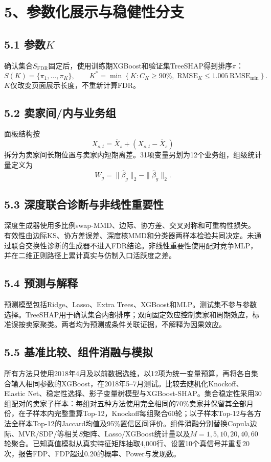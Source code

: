 \documentclass[UTF8,12pt,a4paper]{ctexart}
\begin{document}
\section*{5、参数化展示与稳健性分支}

\subsection*{5.1 参数$K$}

确认集合$S_{\mathrm{FDR}}$固定后，使用训练期XGBoost和验证集TreeSHAP得到排序$\pi$：
\[
S(K)=\{\pi_1,\ldots,\pi_K\},\qquad
K^*=\min\left\{K:C_K\ge90\%,\;
\mathrm{RMSE}_{K}\le1.005\,\mathrm{RMSE}_{\min}\right\}.
\]
$K$仅改变页面展示长度，不重新计算FDR。

\subsection*{5.2 卖家间/内与业务组}

面板结构按
\[
X_{s,t}=\bar X_s+(X_{s,t}-\bar X_s)
\]
拆分为卖家间长期位置与卖家内短期离差。31项变量另划为12个业务组，组级统计量定义为
\[
W_g=\|\widehat\beta_g\|_2-\|\widehat\beta_{\widetilde g}\|_2.
\]

\subsection*{5.3 深度联合诊断与非线性重要性}

深度生成器使用多比例swap-MMD、边际、协方差、交叉对称和可重构性损失。有效性由边际KS、协方差误差、深度核MMD和分类器两样本检验共同决定。未通过联合交换性诊断的生成器不进入FDR结论。非线性重要性使用配对竞争MLP，并在二维正则路径上累计真实与仿制入口活跃度之差。

\subsection*{5.4 预测与解释}

预测模型包括Ridge、Lasso、Extra Trees、XGBoost和MLP。测试集不参与参数选择。TreeSHAP用于确认集合内部排序；双向固定效应控制卖家和周期效应，标准误按卖家聚类。两者均为预测或条件关联证据，不解释为因果效应。

\subsection*{5.5 基准比较、组件消融与模拟}

所有方法只使用2018年4月及以前数据选维，以12项为统一变量预算，再将各自集合输入相同参数的XGBoost，在2018年5--7月测试。比较去随机化Knockoff、Elastic Net、稳定性选择、影子变量树模型与XGBoost-SHAP。集合稳定性采用30组配对的卖家子样本：每组对五种方法使用完全相同的70\%卖家并保留其全部月份，在子样本内完整重算Top-12，Knockoff每组聚合60轮；以子样本Top-12与各方法全样本Top-12的Jaccard均值及95\%置信区间评价。组件消融分别替换Copula边际、MVR/SDP/等相关$S$矩阵、Lasso/XGBoost统计量以及$M=1,5,10,20,40,60$轮聚合。已知真值模拟从真实特征矩阵抽取4,000行、设置10个真信号并重复20次，报告FDP、FDP超过0.20的概率、Power与发现数。
\end{document}
